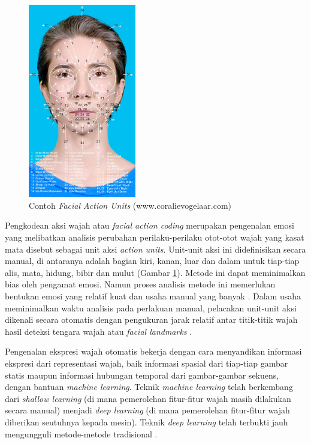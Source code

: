 \begin{figure}
    \centering
    \includegraphics[width=4.7cm]{gambar/facs_coralie_vogelaar.jpg}
    \caption[Contoh \textit{Facial Action Units}]{Contoh \textit{Facial Action Units} (www.coralievogelaar.com)}
    \label{fig:contohfacs}
\end{figure}
Pengkodean aksi wajah atau \textit{facial action coding}  merupakan pengenalan emosi yang melibatkan analisis perubahan perilaku-perilaku otot-otot wajah yang kasat mata disebut sebagai unit aksi \textit{action units}. Unit-unit aksi ini didefinisikan secara manual, di antaranya adalah bagian kiri, kanan, luar dan dalam untuk tiap-tiap alis, mata, hidung, bibir dan mulut (Gambar \ref{fig:contohfacs}). Metode ini dapat meminimalkan bias oleh pengamat emosi. Namun proses analisis metode ini memerlukan bentukan emosi yang relatif kuat dan usaha manual yang banyak . Dalam usaha meminimalkan waktu analisis pada perlakuan manual, pelacakan unit-unit aksi dikenali secara otomatis dengan pengukuran jarak relatif antar titik-titik wajah hasil deteksi tengara wajah atau \textit{facial landmarks} .

Pengenalan ekspresi wajah otomatis bekerja dengan cara menyandikan informasi ekspresi dari representasi wajah, baik informasi spasial dari tiap-tiap gambar statis maupun informasi hubungan temporal dari gambar-gambar sekuens, dengan bantuan \textit{machine learning}. Teknik \textit{machine learning} telah berkembang dari \textit{shallow learning} (di mana pemerolehan fitur-fitur wajah masih dilakukan secara manual) menjadi \textit{deep learning} (di mana pemerolehan fitur-fitur wajah diberikan seutuhnya kepada mesin). Teknik \textit{deep learning} telah terbukti jauh mengungguli metode-metode tradisional .

